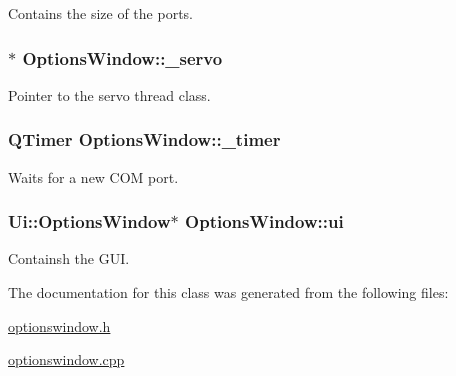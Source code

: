 Contains the size of the ports. 

\hypertarget{class_options_window_acba1566fea3f831000d5e1c1edc3e776}{}
\subsubsection[{\+\_\+servo}]{$\ast$ Options\+Window\+::\+\_\+servo\hspace{0.3cm}{\ttfamily [private]}}\label{class_options_window_acba1566fea3f831000d5e1c1edc3e776}


Pointer to the servo thread class. 

\hypertarget{class_options_window_af6320942b8558140989f552b3bbc1fbd}{}
\subsubsection[{\+\_\+timer}]{\setlength{\rightskip}{0pt plus 5cm}Q\+Timer Options\+Window\+::\+\_\+timer\hspace{0.3cm}{\ttfamily [private]}}\label{class_options_window_af6320942b8558140989f552b3bbc1fbd}


Waits for a new C\+O\+M port. 

\hypertarget{class_options_window_a8347442d5b3b670e8fff0c4102db1f88}{}
\subsubsection[{ui}]{\setlength{\rightskip}{0pt plus 5cm}Ui\+::\+Options\+Window$\ast$ Options\+Window\+::ui\hspace{0.3cm}{\ttfamily [private]}}\label{class_options_window_a8347442d5b3b670e8fff0c4102db1f88}


Containsh the G\+U\+I. 



The documentation for this class was generated from the following files\+:\begin{DoxyCompactItemize}
\item 
\hyperlink{optionswindow_8h}{optionswindow.\+h}\item 
\hyperlink{optionswindow_8cpp}{optionswindow.\+cpp}\end{DoxyCompactItemize}
